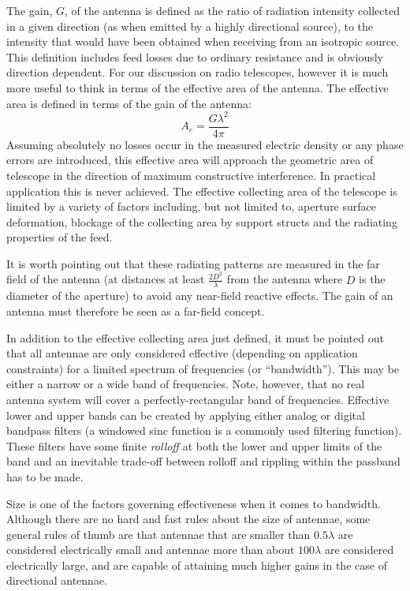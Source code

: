 The gain, $G$, of the antenna is defined as the ratio of radiation intensity collected in a given direction (as when emitted by a highly 
directional source), to the intensity that would have been obtained when receiving from an isotropic source. This definition includes feed losses
due to ordinary resistance and is obviously direction dependent. For our discussion on radio telescopes, however it is much more useful to think in terms of 
the effective area of the antenna. The effective area is defined in terms of the gain of the antenna:
\begin{equation*}
 A_e = \frac{G\lambda^2}{4\pi}
\end{equation*}
Assuming absolutely no losses occur in the measured electric density or any phase errors are introduced, this effective area will approach the geometric area of telescope in the direction
of maximum constructive interference. In practical application this is never achieved. The effective collecting area of the telescope is limited by a variety of
factors including, but not limited to, aperture surface deformation, blockage of the collecting area by support structs and the radiating properties of the feed.

It is worth pointing out that these radiating patterns are measured in the far field of the antenna (at distances at least $\frac{2D^2}{\lambda}$ from
the antenna where $D$ is the diameter of the aperture) to avoid any near-field reactive effects. The gain of an antenna must therefore be seen as a 
far-field concept.

In addition to the effective collecting area just defined, it must be pointed out that all antennae are only considered 
effective (depending on application constraints) for a limited spectrum of frequencies (or ``bandwidth''). This may be 
either a narrow or a wide band of frequencies. Note, however, that no real antenna system will cover a perfectly-rectangular band 
of frequencies. Effective lower and upper bands can be created by applying either analog or digital bandpass filters 
(a windowed sinc function is a commonly used filtering function). These filters have some finite \textit{rolloff} at both 
the lower and upper limits of the band and an inevitable trade-off between rolloff and rippling within the passband has to be made. 

Size is one of the factors governing effectiveness when it comes to bandwidth. Although there are no hard and fast rules about the size of antennae, 
some general rules of thumb are that antennae that are smaller than $0.5\lambda$ are considered electrically small and antennae more than 
about $100\lambda$ are considered electrically large, and are capable of attaining much higher gains in the case of directional antennae.


